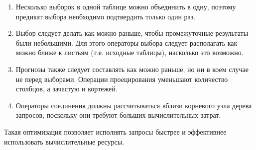 \documentclass{article}
\begin{document}
\begin{enumerate}
    \item Несколько выборок в одной таблице можно объединить в одну, поэтому предикат выбора
    необходимо подтвердить только один раз.
    \item Выбор следует делать как можно раньше, чтобы промежуточные результаты были небольшими.
    Для этого операторы выбора следует располагать как можно ближе к листьям (т.е.
    исходные таблицы), насколько это возможно.
    \item Прогнозы также следует составлять как можно раньше, но ни в коем случае не перед выборами.
    Операции проецирования уменьшают количество столбцов, а зачастую и кортежей.
    \item Операторы соединения должны рассчитываться вблизи корневого узла дерева запросов, поскольку они
    требуют больших вычислительных затрат.
\end{enumerate}
Такая оптимизация позволяет исполнять запросы быстрее и эффективнее использовать вычислительные ресурсы.
\end{document}
